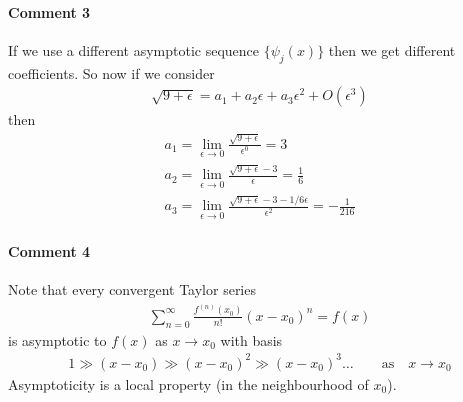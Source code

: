 \paragraph{Comment 3} If we use a different asymptotic sequence $\{\psi_j(x)\}$ then we get different coefficients. So now if we consider
\begin{gather*}
	\sqrt{9+\epsilon} = a_1 + a_2 \epsilon + a_3 \epsilon^2 + O(\epsilon^3)
\end{gather*}
then
\begin{gather*}
a_1 = \lim\limits_{\epsilon \rightarrow 0} \frac{\sqrt{9+\epsilon}}{\epsilon^0} = 3 \\
a_2 = \lim\limits_{\epsilon \rightarrow 0} \frac{\sqrt{9+\epsilon} - 3}{\epsilon} = \frac{1}{6} \\
a_3 = \lim\limits_{\epsilon \rightarrow 0} \frac{\sqrt{9+\epsilon} - 3 - 1/6 \epsilon}{\epsilon^2} = -\frac{1}{216}
\end{gather*}
\paragraph{Comment 4} Note that every convergent Taylor series 
\begin{gather*}
	\sum_{n=0}^{\infty} \frac{f^{(n)}(x_0)}{n!} (x-x_0)^n = f(x)
\end{gather*}
is asymptotic to $f(x)$ as $x \rightarrow x_0$ with basis
\begin{gather*}
	1 \gg (x-x_0) \gg (x-x_0)^2 \gg (x-x_0)^3 \dots \qquad \text{as} \quad x \rightarrow x_0
\end{gather*}
Asymptoticity is a local property (in the neighbourhood of $x_0$).

